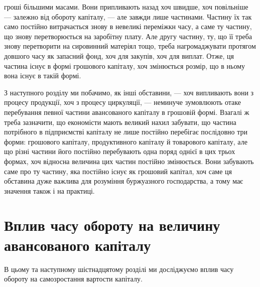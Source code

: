 \parcont{}  %
гроші більшими масами. Вони припливають назад хоч швидше, хоч повільніше
— залежно від обороту капіталу, — але завжди лише частинами.
Частину їх так само постійно витрачається знову в невеликі переміжкн
часу, а саме ту частину, що знову перетворюється на заробітну плату.
Але другу частину, ту, що її треба знову перетворити на сировинний
матеріял тощо, треба нагромаджувати протягом довшого часу як запасний
фонд, хоч для закупів, хоч для виплат. Отже, ця частина існує в формі
грошового капіталу, хоч змінюється розмір, що в ньому вона існує в
такій формі.

З наступного розділу ми побачимо, як інші обставини, — хоч випливають
вони з процесу продукції, хоч з процесу циркуляції, — неминуче
зумовлюють отаке перебування певної частини авансованого капіталу в
грошовій формі. Взагалі ж треба зазначити, що економісти мають великий
нахил забувати, що частина потрібного в підприємстві капіталу не лише
постійно перебігає послідовно три форми: грошового капіталу, продуктивного
капіталу й товарового капіталу, але що різні частини його постійно
перебувають одна поряд однієї в цих трьох формах, хоч відносна
величина цих частин постійно змінюється. Вони забувають саме про ту
частину, яка постійно існує як грошовий капітал, хоч саме ця обставина
дуже важлива для розуміння буржуазного господарства, а тому має значення
також і на практиці.

\section{Вплив часу обороту на величину авансованого
капіталу}

В цьому та наступному шістнадцятому розділі ми досліджуємо вплив
часу обороту на самозростання вартости капіталу.

